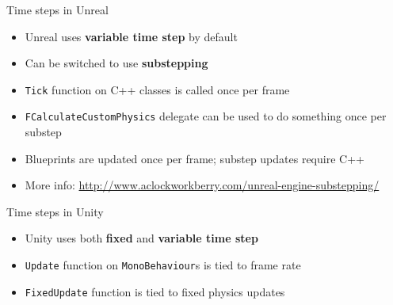\begin{frame}{Time steps in Unreal}
    \begin{itemize}
        \pause\item Unreal uses \textbf{variable time step} by default
        \pause\item Can be switched to use \textbf{substepping}
        \pause\item \lstinline{Tick} function on C++ classes is called once per frame
        \pause\item \lstinline{FCalculateCustomPhysics} delegate can be used to do something once per substep
        \pause\item Blueprints are updated once per frame; substep updates require C++
        \pause\item More info: \url{http://www.aclockworkberry.com/unreal-engine-substepping/}
    \end{itemize}
\end{frame}

\begin{frame}{Time steps in Unity}
    \begin{itemize}
        \pause\item Unity uses both \textbf{fixed} and \textbf{variable time step}
        \pause\item \lstinline{Update} function on \lstinline{MonoBehaviour}s is tied to frame rate
        \pause\item \lstinline{FixedUpdate} function is tied to fixed physics updates
    \end{itemize}
\end{frame}
